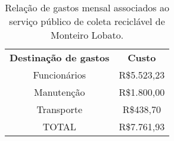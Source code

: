 \begin{table}[htbp]
  \centering
  \caption{Relação de gastos mensal associados ao serviço público de coleta reciclável de Monteiro Lobato.}
    \begin{tabular}{c|c}
    \rowcolor[rgb]{ .969,  .588,  .275} \textcolor[rgb]{ 1,  1,  1}{\textbf{Destinação de gastos}} & \textcolor[rgb]{ 1,  1,  1}{\textbf{Custo}} \\
    \rowcolor[rgb]{ .992,  .914,  .851} Funcionários & R\$5.523,23 \\
    \rowcolor[rgb]{ .984,  .831,  .706} Manutenção & R\$1.800,00 \\
    \rowcolor[rgb]{ .992,  .914,  .851} Transporte & R\$438,70 \\
    \rowcolor[rgb]{ .984,  .831,  .706} TOTAL & R\$7.761,93 \\
    \end{tabular}%
  \label{tab:gasto_reciclavel}%
\end{table}%
